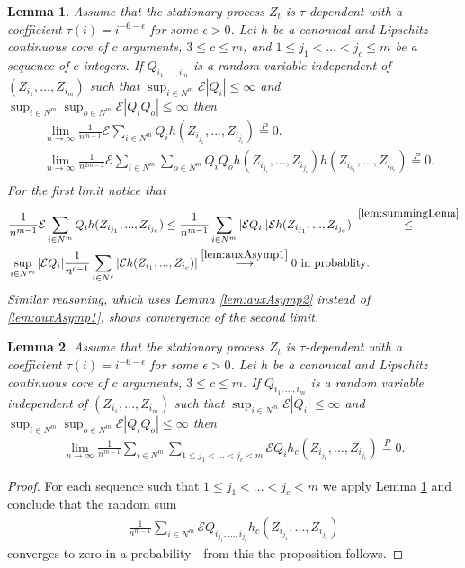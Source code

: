 \documentclass{article} %
\newtheorem{lemma}{Lemma}
\newcommand{\ev}{\mathcal{E}}
\begin{document}
\begin{lemma}
\label{lem:auxAsymp2a}
Assume that the stationary process $Z_t$ is $\tau$-dependent with a coefficient $\tau(i) = i^{-6-\epsilon}$ for some $\epsilon>0$. Let $h$ be a canonical and Lipschitz continuous core of $c$ arguments, $3 \leq c \leq m$, and $1 \leq j_1 < ...<j_c \leq m$ be a sequence of $c$ integers. If $Q_{i_1,...,i_m}$ is a random variable independent of $(Z_{i_1},...,Z_{i_m})$ such that $\sup_{i \in N^m} \ev |Q_i| \leq \infty$ and $\sup_{i \in N^{m}} \sup_{o \in N^m} \ev |Q_i Q_o| \leq \infty$  then 
\begin{align}
&\lim_{n \to \infty}\frac{1} {n^{m-1}} \ev  \sum_{i \in N^{m}}  Q_i h(Z_{i_{j_1}},...,Z_{i_{j_c}}) \overset{P}{=} 0. \\
&\lim_{n \to \infty}\frac{1} {n^{2m-2}} \ev  \sum_{i \in N^{m}} \sum_{o \in N^{m}}  Q_i Q_o h(Z_{i_{j_1}},...,Z_{i_{j_c}}) h(Z_{i_{o_1}},...,Z_{i_{o_c}}) \overset{P}{=} 0. \\
\end{align}
For the first limit notice  that 
\begin{align}
&\frac{1} {n^{m-1}} \ev  \sum_{i \in N^{m}}  Q_i h(Z_{i_{j_1}},...,Z_{i_{j_c}}) \leq  \frac{1} {n^{m-1}}  \sum_{i \in N^{m}}  |\ev Q_i| |\ev h(Z_{i_{j_1}},...,Z_{i_{j_c}})| \overset{ \ref{lem:summingLema}}{\leq} \\
& \sup_{i \in N^m} |\ev Q_i|   \frac{1} {n^{c-1}}  \sum_{i \in N^c} |\ev h(Z_{i_1},...,Z_{i_c})| \overset{\ref{lem:auxAsymp1}}{\longrightarrow} 0 \text{  in probablity}. 
\end{align}
Similar reasoning, which uses Lemma \ref{lem:auxAsymp2} instead of \ref{lem:auxAsymp1}, shows convergence of the second limit. 
\end{lemma}


\begin{lemma}
\label{lem:higherVstats}
Assume that the stationary process $Z_t$ is $\tau$-dependent with a coefficient $\tau(i) = i^{-6-\epsilon}$ for some $\epsilon>0$. Let $h$ be a canonical and Lipschitz continuous core of $c$ arguments, $3 \leq c \leq m$. If $Q_{i_1,...,i_m}$ is a random variable independent of $(Z_{i_1},...,Z_{i_m})$ such that $\sup_{i \in N^m} \ev |Q_i| \leq \infty$ and $\sup_{i \in N^{m}} \sup_{o \in N^m} \ev |Q_i Q_o| \leq \infty$  then 
\begin{align}
\lim_{n \to \infty} \frac {1} {n^{m-1}} \sum_{i \in N^m}  \sum_{1 \leq j_1<...<j_c < m} \ev Q_i   h_c(Z_{i_{j_1}},...,Z_{i_{j_c}}) \overset{P}{=} 0.
\end{align}
\end{lemma}
\begin{proof}
For each sequence such that  $1 \leq j_1<...<j_c < m$  we apply Lemma \ref{lem:auxAsymp2a} and  conclude that the random sum 
\begin{align}
\frac {1} {n^{m-1}} \sum_{i \in N^m} \ev Q_{i_{j_1},...,i_{j_c}}   h_c(Z_{i_{j_1}},...,Z_{i_{j_c}})
\end{align}
converges to zero in a probability - from this the proposition follows.
\end{proof}
\end{document}
